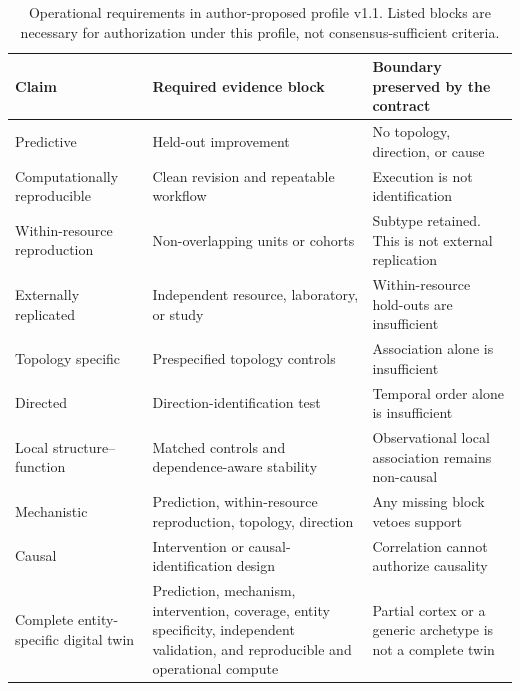 \begin{table}[t!]
\centering
\caption{Operational requirements in author-proposed profile v1.1. Listed blocks are necessary for authorization under this profile, not consensus-sufficient criteria.}
\label{tab:claim-semantics}
\scriptsize
\renewcommand{\arraystretch}{0.96}
\begin{tabularx}{\textwidth}{@{}>{\raggedright\arraybackslash}p{}YY@{}}
\toprule
Claim & Required evidence block & Boundary preserved by the contract \\
\midrule
Predictive & Held-out improvement & No topology, direction, or cause \\
Computationally reproducible & Clean revision and repeatable workflow & Execution is not identification \\
Within-resource reproduction & Non-overlapping units or cohorts & Subtype retained. This is not external replication \\
Externally replicated & Independent resource, laboratory, or study & Within-resource hold-outs are insufficient \\
Topology specific & Prespecified topology controls & Association alone is insufficient \\
Directed & Direction-identification test & Temporal order alone is insufficient \\
Local structure--function & Matched controls and dependence-aware stability & Observational local association remains non-causal \\
Mechanistic & Prediction, within-resource reproduction, topology, direction & Any missing block vetoes support \\
Causal & Intervention or causal-identification design & Correlation cannot authorize causality \\
Complete entity-specific digital twin & Prediction, mechanism, intervention, coverage, entity specificity, independent validation, and reproducible and operational compute & Partial cortex or a generic archetype is not a complete twin \\
\bottomrule
\end{tabularx}
\end{table}
